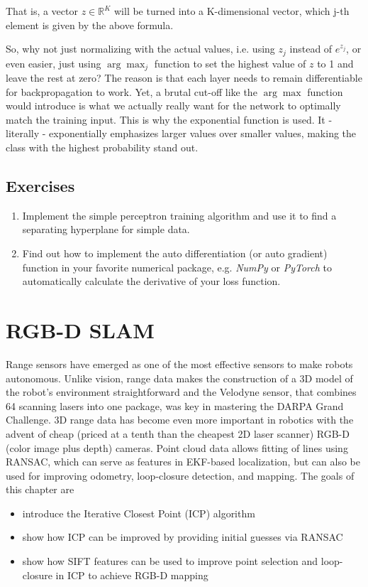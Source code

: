 \documentclass[paper=6.14in:9.21in,pagesize=pdftex,11pt,twoside,openright]{scrbook}
\begin{document}
That is, a vector $z \in \mathbb{R}^K$ will be turned into a K-dimensional vector, which j-th element is given by the above formula.

So, why not just normalizing with the actual values, i.e. using $z_j$ instead of $e^{z_j}$, or even easier, just using $\arg \max_j$ function to set the highest value of $z$ to 1 and leave the rest at zero? The reason is that each layer needs to remain differentiable for backpropagation to work. Yet, a brutal cut-off like the $\arg \max$ function would introduce is what we actually really want for the network to optimally match the training input. This is why the exponential function is used. It - literally - exponentially emphasizes larger values over smaller values, making the class with the highest probability stand out.


\section{Exercises}
\begin{enumerate}
\item Implement the simple perceptron training algorithm and use it to find a separating hyperplane for simple data.
\item Find out how to implement the auto differentiation (or auto gradient) function in your favorite numerical package, e.g. \emph{NumPy} or \emph{PyTorch} to automatically calculate the derivative of your loss function.
\end{enumerate}


\chapter{RGB-D SLAM}
 Range sensors have emerged as one of the most effective sensors to make robots autonomous. Unlike vision, range data makes the construction of a 3D model of the robot's environment straightforward and the Velodyne sensor, that combines 64 scanning lasers into one package, was key in mastering the DARPA Grand Challenge.  3D range data has become even more important in robotics with the advent of cheap (priced at a tenth than the cheapest 2D laser scanner) RGB-D (color image plus depth) cameras. Point cloud data allows fitting of lines using RANSAC, which can serve as features in EKF-based localization, but can also be used for improving odometry, loop-closure detection, and mapping. The goals of this chapter are
\begin{itemize}
\item introduce the Iterative Closest Point (ICP) algorithm
\item show how ICP can be improved by providing initial guesses via RANSAC
\item show how SIFT features can be used to improve point selection and loop-closure in ICP to achieve RGB-D mapping
\end{itemize}
\end{document}

